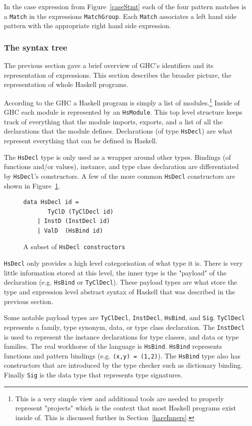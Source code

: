 In the case expression from Figure~\ref{caseStmt} each of the four pattern matches is a \texttt{Match} in the expressions \texttt{MatchGroup}. Each \texttt{Match} associates a left hand side pattern with the appropriate right hand side expression. 

\subsubsection{The syntax tree}
The previous section gave a brief overview of GHC's identifiers and its representation of expressions. This section describes the broader picture, the representation of whole Haskell programs.  

According to the GHC a Haskell program is simply a list of modules.\footnote{This is a very simple view and additional tools are needed to properly represent "projects" which is the context that most Haskell programs exist inside of. This is discussed further in Section~\ref{hareInners}.} Inside of GHC each module is represented by an \texttt{HsModule}. This top level structure keeps track of everything that the module imports, exports, and a list of all the declarations that the module defines. Declarations (of type \texttt{HsDecl}) are what represent everything that can be defined in Haskell. 

The \texttt{HsDecl} type is only used as a wrapper around other types. Bindings (of functions and/or values), instance, and type class declaration are differentiated by \texttt{HsDecl}'s constructors. A few of the more common \texttt{HsDecl} constructors are shown in Figure~\ref{hsdecl}. 

\begin{figure}
\begin{lstlisting}
data HsDecl id =
	   TyClD (TyClDecl id)
	| InstD (InstDecl id)
	| ValD  (HsBind id)
\end{lstlisting}
\caption{A subset of \texttt{HsDecl constructors}}
\label{hsdecl}
\end{figure}

\texttt{HsDecl} only provides a high level categorisation of what type it is. There is very little information stored at this level, the inner type is the "payload" of the declaration (e.g. \texttt{HsBind} or \texttt{TyClDecl}). These payload types are what store the type and expression level abstract syntax of Haskell that was described in the previous section.

Some notable payload types are \texttt{TyClDecl}, \texttt{InstDecl}, \texttt{HsBind}, and \texttt{Sig}. \texttt{TyClDecl} represents a family, type synonym, data, or type class declaration. The \texttt{InstDecl} is used to represent the instance declarations for type classes, and data or type families. The real workhorse of the language is \texttt{HsBind}. \texttt{HsBind} represents functions and pattern bindings (e.g. \texttt{(x,y) = (1,2)}). The \texttt{HsBind} type also has constructors that are introduced by the type checker such as dictionary binding. Finally \texttt{Sig} is the data type that represents type signatures. 

